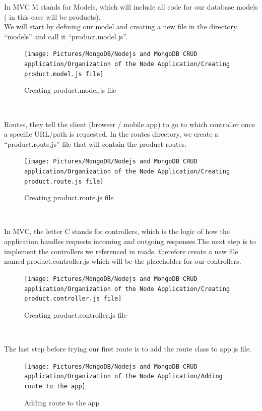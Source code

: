 \begin{spacing}{1.2}
\par In MVC M stands for Models, which will include all code for our database models (
in this case will be products).\\ We will start by defining our model and creating a new file in the directory
“models” and call it “product.model.js”.
\\
\begin{figure}[!htb] 
\begin{center} 
\texttt{[image: Pictures/MongoDB/Nodejs and MongoDB CRUD  application/Organization of the Node Application/Creating product.model.js file]} 
\end{center} 
\caption{Creating product.model.js file} 
\end{figure}  \FloatBarrier
\\
\newpage
\par Routes, they tell the client (browser / mobile app)
to go to which controller once a specific URL/path is requested. In the routes directory, we create a “product.route.js” file that will contain the product routes.
\\
\begin{figure}[!htb] 
\begin{center} 
\texttt{[image: Pictures/MongoDB/Nodejs and MongoDB CRUD  application/Organization of the Node Application/Creating product.route.js file]} 
\end{center} 
\caption{Creating product.route.js file} 
\end{figure}  \FloatBarrier
\\

\par In MVC, the letter C stands for controllers, which is the logic of how the application handles requests incoming and outgoing responses.The next step is to implement the controllers we referenced in roads. therefore create a new file named product.controller.js which will be the placeholder for our controllers.
\\
\begin{figure}[!htb] 
\begin{center} 
\texttt{[image: Pictures/MongoDB/Nodejs and MongoDB CRUD  application/Organization of the Node Application/Creating product.controller.js file]} 
\end{center} 
\caption{Creating product.controller.js file} 
\end{figure}  \FloatBarrier
\\
\newpage
\par The last step before trying our first route is to add the route class to app.js file.
\\
\begin{figure}[!htb] 
\begin{center} 
\texttt{[image: Pictures/MongoDB/Nodejs and MongoDB CRUD  application/Organization of the Node Application/Adding route to the app]} 
\end{center} 
\caption{Adding route to the app} 
\end{figure}  \FloatBarrier
\\


\end{spacing}
